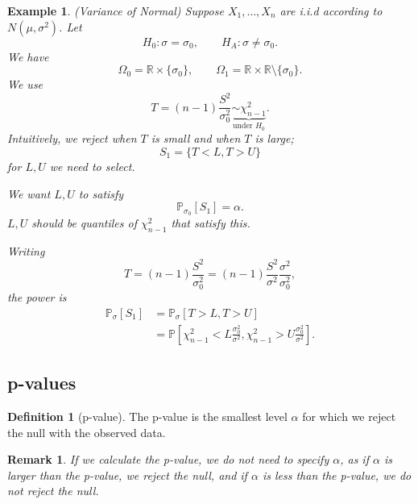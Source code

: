 \documentclass{tufte-handout}
\newcommand*\R{\mathbb{R}}
\renewcommand{\P}{\mathbb{P}}
\newtheorem{rmk}[thm]{Remark}
\newtheorem{ex}[thm]{Example}
\theoremstyle{definition}
\newtheorem{defn}[thm]{Definition}
\begin{document}
\begin{ex}
	(Variance of Normal) Suppose $X_1,\ldots,X_n$ are i.i.d according to $N(\mu,\sigma^2)$. Let \[
		H_0: \sigma = \sigma_0, \qquad H_A: \sigma \ne \sigma_0
	.\]  We have \[
		\Omega_0 = \R \times \{\sigma_0\}, \qquad \Omega_1 =\R\times \R\setminus \{\sigma_0\}
	.\] 
	We use \[
		T = (n-1) \frac{S^2}{\sigma_0^2} \underbrace{\sim \chi_{n-1}^2}_{\text{under } H_0}
	.\] Intuitively, we reject when $T$ is small and when $T$ is large; \[
		S_1 = \{T < L, T > U\}
	\] for $L,U$ we need to select.
	
	We want $L,U$ to satisfy \[
		\P_{\sigma_0}\left[S_1\right] = \alpha
	.\] $L,U$ should be quantiles of $\chi_{n-1}^2$ that satisfy this.

	Writing \[
		T = (n-1) \frac{S^2}{\sigma_0^2} = (n-1) \frac{S^2}{\sigma^2} \frac{\sigma^2}{\sigma_0^2}
	,\] the power is
	\begin{align*}
		\P_\sigma\left[S_1 \right] &= \P_\sigma\left[T > L, T > U\right] \\
		&= \P\left[\chi_{n-1}^2 < L \frac{\sigma_0^2}{\sigma^2}, \chi_{n-1}^2 > U \frac{\sigma_0^2}{\sigma^2}\right] 
	.\end{align*}
\end{ex}

\subsection{p-values}
\begin{defn}[p-value]
	The p-value is the smallest level $\alpha$ for which we reject the null with the observed data.
\end{defn}
\begin{rmk}
	If we calculate the p-value, we do not need to specify $\alpha$, as if $\alpha$ is larger than the p-value, we reject the null, and if $\alpha$ is less than the p-value, we do not reject the null.
\end{rmk}
\end{document}
